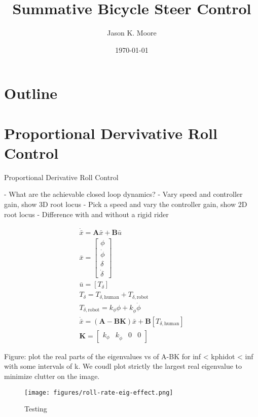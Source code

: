 \documentclass[12pt]{article}
\title{Summative Bicycle Steer Control}
\author{Jason K. Moore}
\date{\today}
\begin{document}
\maketitle

\section{Outline}

\section{Proportional Dervivative Roll Control}

Proportional Derivative Roll Control

- What are the achievable closed loop dynamics?
- Vary speed and controller gain, show 3D root locus
- Pick a speed and vary the controller gain, show 2D root locus
- Difference with and without a rigid rider

\begin{align}
  \dot{\bar{x}} = \mathbf{A} \bar{x} + \mathbf{B} \bar{u} \\
  \bar{x} = \begin{bmatrix} \phi \\ \dot{\phi} \\ \delta \\ \dot{\delta} \end{bmatrix} \\
  \bar{u} = \left[ T_\delta \right] \\
  T_\delta = T_{\delta,\textrm{human}} + T_{\delta,\textrm{robot}} \\
  T_{\delta,\textrm{robot}} = k_\phi \phi + k_{\dot{\phi}} \dot{\phi} \\
  \dot{\bar{x}} = \left( \mathbf{A} - \mathbf{B} \mathbf{K} \right) \bar{x} + \mathbf{B} \left[ T_{\delta,\textrm{human}} \right] \\
  \mathbf{K} = \begin{bmatrix} k_\phi & k_{\dot{\phi}} & 0 & 0 \end{bmatrix}
\end{align}

Figure: plot the real parts of the eigenvalues vs of A-BK for inf < kphidot <
inf with some intervals of k. We coudl plot strictly the largest real
eigenvalue to minimize clutter on the image.

\begin{figure}
  \centering
  \texttt{[image: figures/roll-rate-eig-effect.png]}
  \caption{Testing}
  \label{fig:roll-rate-eig-effect}
\end{figure}
\end{document}
